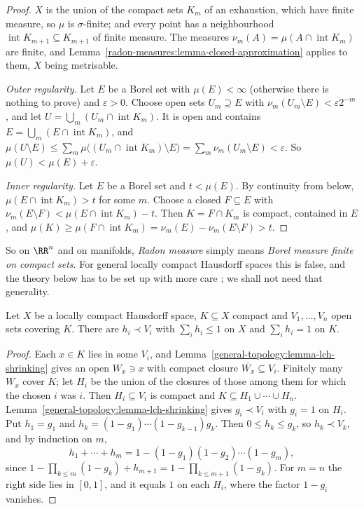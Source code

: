 \begin{proof}
$X$ is the union of the compact sets $K_m$ of an exhaustion, which have finite measure, so $\mu$ is $\sigma$-finite; and every point has a neighbourhood $\operatorname{int}K_{m+1} \subseteq K_{m+1}$ of finite
measure. The measures $\nu_m(A) = \mu(A \cap \operatorname{int}K_m)$ are finite, and Lemma~\ref{radon-measures:lemma-closed-approximation} applies to them, $X$ being metrisable.

\emph{Outer regularity.} Let $E$ be a Borel set with $\mu(E) < \infty$ (otherwise there is nothing to prove) and $\varepsilon > 0$. Choose open sets $U_m \supseteq E$ with
$\nu_m(U_m \setminus E) < \varepsilon2^{-m}$, and let $U = \bigcup_m(U_m \cap \operatorname{int}K_m)$. It is open and contains $E = \bigcup_m(E \cap \operatorname{int}K_m)$, and
$\mu(U \setminus E) \leq \sum_m\mu\bigl((U_m \cap \operatorname{int}K_m) \setminus E\bigr) = \sum_m\nu_m(U_m \setminus E) < \varepsilon$. So $\mu(U) < \mu(E) + \varepsilon$.

\emph{Inner regularity.} Let $E$ be a Borel set and $t < \mu(E)$. By continuity from below, $\mu(E \cap \operatorname{int}K_m) > t$ for some $m$. Choose a closed $F \subseteq E$ with
$\nu_m(E \setminus F) < \mu(E \cap \operatorname{int}K_m) - t$. Then $K = F \cap K_m$ is compact, contained in $E$, and
$\mu(K) \geq \mu(F \cap \operatorname{int}K_m) = \nu_m(E) - \nu_m(E \setminus F) > t$.
\end{proof}

So on $\RR^n$ and on manifolds, \emph{Radon measure} simply means \emph{Borel measure finite on compact sets}. For general locally compact Hausdorff spaces this is false, and the theory below has to
be set up with more care \cite[Chapter 2]{rudin-rca}; we shall not need that generality.

\begin{lemma}\label{radon-measures:lemma-partition-compact}
Let $X$ be a locally compact Hausdorff space, $K \subseteq X$ compact and $V_1, \ldots, V_n$ open sets covering $K$. There are $h_i \prec V_i$ with $\sum_ih_i \leq 1$ on $X$ and $\sum_ih_i = 1$ on $K$.
\end{lemma}

\begin{proof}
Each $x \in K$ lies in some $V_i$, and Lemma~\ref{general-topology:lemma-lch-shrinking} gives an open $W_x \ni x$ with compact closure $\overline{W_x} \subseteq V_i$. Finitely many $W_x$ cover $K$; let $H_i$ be
the union of the closures of those among them for which the chosen $i$ was $i$. Then $H_i \subseteq V_i$ is compact and $K \subseteq H_1 \cup \cdots \cup H_n$. Lemma~\ref{general-topology:lemma-lch-shrinking}
gives $g_i \prec V_i$ with $g_i = 1$ on $H_i$. Put $h_1 = g_1$ and $h_k = (1 - g_1)\cdots(1 - g_{k-1})g_k$. Then $0 \leq h_k \leq g_k$, so $h_k \prec V_k$, and by induction on $m$,
\[
h_1 + \cdots + h_m = 1 - (1 - g_1)(1 - g_2)\cdots(1 - g_m),
\]
since $1 - \prod_{k \leq m}(1 - g_k) + h_{m+1} = 1 - \prod_{k \leq m+1}(1 - g_k)$. For $m = n$ the right side lies in $[0, 1]$, and it equals $1$ on each $H_i$, where the factor $1 - g_i$ vanishes.
\end{proof}

